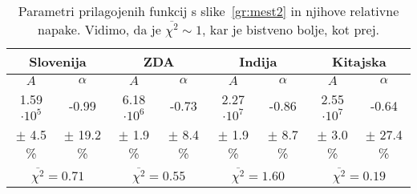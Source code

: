 \documentclass[a4 paper, 12pt]{article}
\begin{document}
\begin{table}[H]\centering
	\caption{Parametri prilagojenih funkcij s slike~\ref{gr:mest2} in njihove relativne napake. Vidimo, da je
		$\overline{\chi^2} \sim 1$, kar je bistveno bolje, kot prej.}
	\begin{tabular}{c|c|c|c|c|c|c|c}
		\multicolumn{2}{c|}{Slovenija} &
		\multicolumn{2}{c|}{ZDA} &
		\multicolumn{2}{c|}{Indija} &
		\multicolumn{2}{c}{Kitajska} \\
		\hline
		$A$ & $\alpha$ & $A$ & $\alpha$ & $A$ & $\alpha$ & $A$ & $\alpha$ \\
		\hline\hline
		1.59 $\cdot 10^5$ & -0.99 & 6.18 $\cdot 10^6$ & -0.73 & 2.27 $\cdot 10^7$ & -0.86& 2.55 $\cdot 10^7$ &-0.64 \\
		$\pm$ 4.5 \% & $\pm$ 19.2 \% & $\pm$ 1.9 \% & $\pm$ 8.4 \% & $\pm$ 1.9 \% & $\pm$ 8.7 \% &
			$\pm$ 3.0 \% & $\pm$ 27.4 \% \\
		\hline
		\multicolumn{2}{c|}{$\overline{\chi^2} = 0.71$} &
		\multicolumn{2}{c|}{$\overline{\chi^2} = 0.55$} &
		\multicolumn{2}{c|}{$\overline{\chi^2} = 1.60$} &
		\multicolumn{2}{c}{$\overline{\chi^2} = 0.19$}
	\end{tabular}
	\label{tab2}
\end{table}
\end{document}
